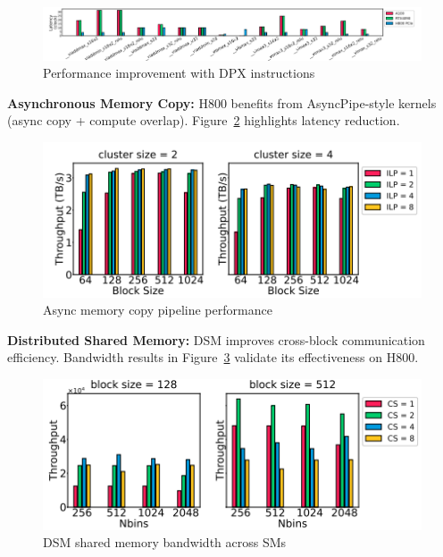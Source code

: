 \begin{figure}[H]
\centering
\includegraphics[width=0.75\linewidth]{images/dpx_perf.png}
\caption{Performance improvement with DPX instructions}
\label{fig:dpx_perf}
\end{figure}

\textbf{Asynchronous Memory Copy:}  
H800 benefits from AsyncPipe-style kernels (async copy + compute overlap). Figure~\ref{fig:asyncpipe_perf} highlights latency reduction.

\begin{figure}[H]
\centering
\includegraphics[width=0.75\linewidth]{images/asyncpipe_perf.png}
\caption{Async memory copy pipeline performance}
\label{fig:asyncpipe_perf}
\end{figure}

\textbf{Distributed Shared Memory:}  
DSM improves cross-block communication efficiency. Bandwidth results in Figure~\ref{fig:dsm_perf} validate its effectiveness on H800.

\begin{figure}[H]
\centering
\includegraphics[width=0.75\linewidth]{images/dsm_perf.png}
\caption{DSM shared memory bandwidth across SMs}
\label{fig:dsm_perf}
\end{figure}
